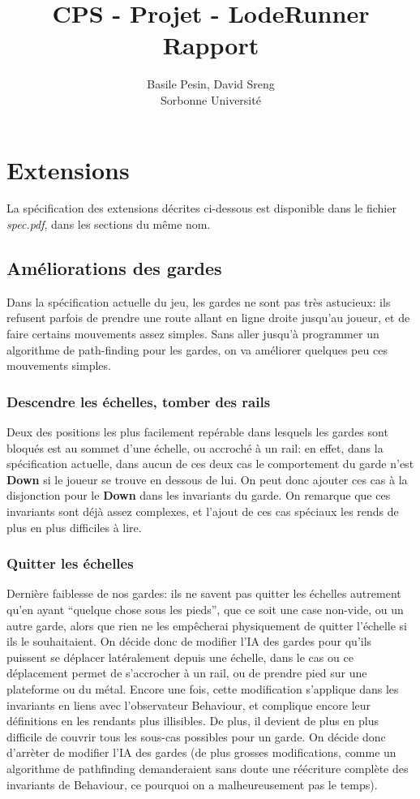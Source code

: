 \documentclass{article}
\title{CPS - Projet - LodeRunner\\Rapport}
\author{Basile Pesin, David Sreng\\Sorbonne Université}
\begin{document}
\maketitle

\section{Extensions}
La spécification des extensions décrites ci-dessous est disponible dans le fichier \textit{spec.pdf}, dans les sections du même nom.

\subsection{Améliorations des gardes}
Dans la spécification actuelle du jeu, les gardes ne sont pas très astucieux: ils refusent parfois de prendre une route allant en ligne droite jusqu'au joueur, et de faire certains mouvements assez simples. Sans aller jusqu'à programmer un algorithme de path-finding pour les gardes, on va améliorer quelques peu ces mouvements simples.

\subsubsection{Descendre les échelles, tomber des rails}
Deux des positions les plus facilement repérable dans lesquels les gardes sont bloqués est au sommet d'une échelle, ou accroché à un rail: en effet, dans la spécification actuelle, dans aucun de ces deux cas le comportement du garde n'est \textbf{Down} si le joueur se trouve en dessous de lui. On peut donc ajouter ces cas à la disjonction pour le \textbf{Down} dans les invariants du garde. On remarque que ces invariants sont déjà assez complexes, et l'ajout de ces cas spéciaux les rends de plus en plus difficiles à lire.

\subsubsection{Quitter les échelles}
Dernière faiblesse de nos gardes: ils ne savent pas quitter les échelles autrement qu'en ayant ``quelque chose sous les pieds'', que ce soit une case non-vide, ou un autre garde, alors que rien ne les empêcherai physiquement de quitter l'échelle si ils le souhaitaient. On décide donc de modifier l'IA des gardes pour qu'ils puissent se déplacer latéralement depuis une échelle, dans le cas ou ce déplacement permet de s'accrocher à un rail, ou de prendre pied sur une plateforme ou du métal. Encore une fois, cette modification s'applique dans les invariants en liens avec l'observateur \textrm{Behaviour}, et complique encore leur définitions en les rendants plus illisibles. De plus, il devient de plus en plus difficile de couvrir tous les sous-cas possibles pour un garde. On décide donc d'arrèter de modifier l'IA des gardes (de plus grosses modifications, comme un algorithme de pathfinding demanderaient sans doute une réécriture complète des invariants de \textrm{Behaviour}, ce pourquoi on a malheureusement pas le temps).
\end{document}
